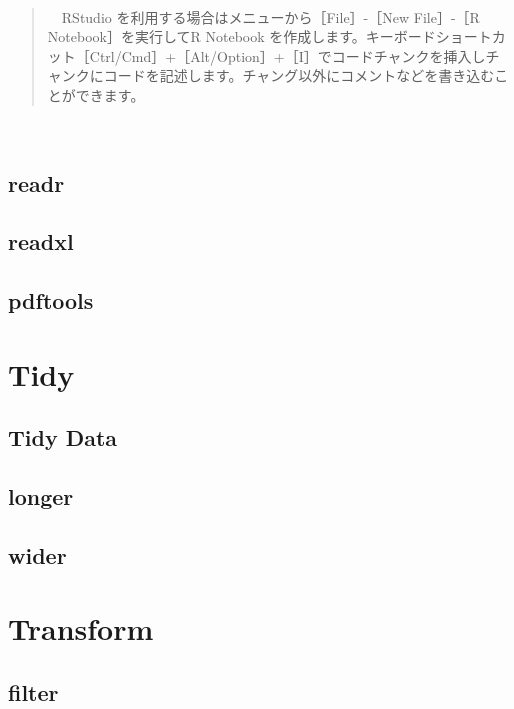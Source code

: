 \documentclass[
  12pt,
]{book}
\begin{document}
　

\begin{quote}
　RStudio を利用する場合はメニューから［File］-［New File］-［R Notebook］を実行してR Notebook を作成します。キーボードショートカット［Ctrl/Cmd］+［Alt/Option］+［I］でコードチャンクを挿入しチャンクにコードを記述します。チャング以外にコメントなどを書き込むことができます。
\end{quote}

　

\hypertarget{readr}{%
\section{readr}\label{readr}}

\hypertarget{readxl}{%
\section{readxl}\label{readxl}}

\hypertarget{pdftools}{%
\section{pdftools}\label{pdftools}}

\hypertarget{tidy-1}{%
\chapter{Tidy}\label{tidy-1}}

\hypertarget{tidy-data}{%
\section{Tidy Data}\label{tidy-data}}

\hypertarget{longer}{%
\section{longer}\label{longer}}

\hypertarget{wider}{%
\section{wider}\label{wider}}

\hypertarget{transform-1}{%
\chapter{Transform}\label{transform-1}}

\hypertarget{filter}{%
\section{filter}\label{filter}}
\end{document}
